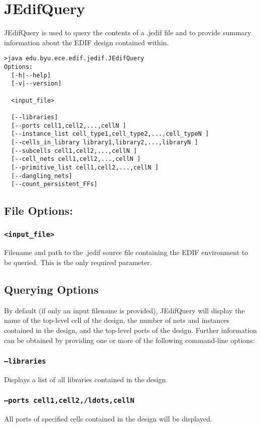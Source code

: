 \section{JEdifQuery}
JEdifQuery is used to query the contents of a .jedif file and to
provide summary information about the EDIF design contained within.
\begin{verbatim}
>java edu.byu.ece.edif.jedif.JEdifQuery
Options:
  [-h|--help]
  [-v|--version]

  <input_file>

  [--libraries]
  [--ports cell1,cell2,...,cellN ]
  [--instance_list cell_type1,cell_type2,...,cell_typeN ]
  [--cells_in_library library1,library2,...,libraryN ]
  [--subcells cell1,cell2,...,cellN ]
  [--cell_nets cell1,cell2,...,cellN ]
  [--primitive_list cell1,cell2,...,cellN ]
  [--dangling_nets]
  [--count_persistent_FFs]
\end{verbatim}

\subsection{File Options:}
\subsubsection{\texttt{<input\_file>}}
Filename and path to the .jedif source file containing the EDIF environment to
be queried. This is the only required parameter.

\subsection{Querying Options}
By default (if only an input filename is provided), JEdifQuery will
display the name of the top-level cell of the design, the number of
nets and instances contained in the design, and the top-level ports
of the design. Further information can be obtained by providing one
or more of the following command-line options:

\subsubsection{\texttt{--libraries}}
Displays a list of all libraries contained in the design.

\subsubsection{\texttt{--ports cell1,cell2,/ldots,cellN}}
All ports of specified cells contained in the design will be displayed.

